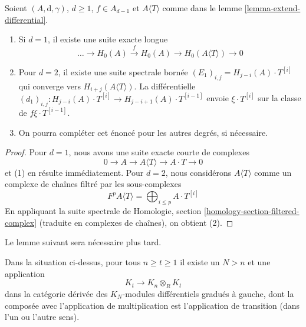 \begin{lemma}
\label{lemma-compute-cohomology-adjoin-variable}
Soient $(A, \text{d}, \gamma)$, $d \geq 1$, $f \in A_{d - 1}$ et
$A\langle T \rangle$ comme dans le lemme \ref{lemma-extend-differential}.
\begin{enumerate}
\item Si $d = 1$, il existe une suite exacte longue
$$
\ldots\to H_0(A) \xrightarrow{f} H_0(A) \to H_0(A\langle T \rangle) \to 0
$$
\item Pour $d = 2$, il existe une suite spectrale bornée
$(E_1)_{i, j} = H_{j - i}(A) \cdot T^{[i]}$
qui converge vers $H_{i + j}(A\langle T \rangle)$. La différentielle
$(d_1)_{i, j} : H_{j - i}(A) \cdot T^{[i]} \to
H_{j - i + 1}(A) \cdot T^{[i - 1]}$
envoie $\xi\cdot T^{[i]}$ sur la classe de $f \xi\cdot T^{[i - 1]}$.
\item On pourra compléter cet énoncé pour les autres degrés, si nécessaire.
\end{enumerate}
\end{lemma}

\begin{proof}
Pour $d = 1$, nous avons une suite exacte courte de complexes
$$
0 \to A \to A\langle T \rangle\to A \cdot T \to 0
$$
et (1) en résulte immédiatement. Pour $d = 2$, nous considérons
$A\langle T \rangle$ comme un complexe de chaînes filtré par les sous-complexes
$$
F^pA\langle T \rangle = \bigoplus\nolimits_{i \leq p} A \cdot T^{[i]}
$$
En appliquant la suite spectrale de
Homologie, section \ref{homology-section-filtered-complex}
(traduite en complexes de chaînes), on obtient (2).
\end{proof}

\noindent
Le lemme suivant sera nécessaire plus tard.

\begin{lemma}
\label{lemma-construct-some-maps}
Dans la situation ci-dessus, pour tous $n \geq t \geq 1$ il existe un $N > n$
et une application
$$
K_t \longrightarrow K_n \otimes_R K_t
$$
dans la catégorie dérivée des $K_N$-modules
différentiels gradués à gauche, dont la composée avec l'application de multiplication est l'application de
transition (dans l'un ou l'autre sens).
\end{lemma}

